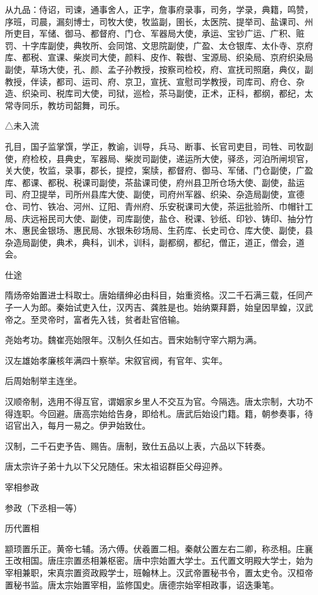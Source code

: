 \documentclass[a4paper,12pt,UTF8,twoside]{ctexbook}
\begin{document}
    从九品：侍诏，司谏，通事舍人，正字，詹事府录事，司务，学录，典籍，鸣赞，序班，司晨，漏刻博士，司牧大使，牧监副，圉长，太医院、提举司、盐课司、州所吏目，军储、御马、都督府、门仓、军器局大使，承运、宝钞广运、广积、赃罚、十字库副使，典牧所、会同馆、文思院副使，广盈、太仓银库、太仆寺、京府库、都税、宣课、柴炭司大使，颜料、皮作、鞍辔、宝源局、织染局、京府织染局副使，草场大使，孔、颜、孟子孙教授，按察司检校，府、宣抚司照磨，典仪，副教授，伴读，都司、运司、府、京卫，宣抚、宣慰司学教授，司库司、府仓、杂造、织染司、税库司大使，司狱，巡检，茶马副使，正术，正科，都纲，都纪，太常寺同乐，教坊司韶舞，司乐。
    
    △未入流
    
    孔目，国子监掌馔，学正，教谕，训导，兵马、断事、长官司吏目，司牲、司牧副使，府检校，县典史，军器局、柴炭司副使，递运所大使，驿丞，河泊所闸坝官，关大使，牧监，录事，郡长，提控，案牍，都督府、御马、军储、门仓副使，广盈库、都课、都税、税课司副使，茶盐课司使，府州县卫所仓场大使、副使，盐运司、府卫提举，司所州县库大使、副使，司府州军器、织染、杂造局副使，宣德仓、司竹、铁冶、河州、辽阳、青州府、乐安税课司大使，茶运批验所、巾帽针工局、庆远裕民司大使、副使，司库副使，盐仓、税课、钞纸、印钞、铸印、抽分竹木、惠民金银场、惠民局、水银朱砂场局、生药库、长史司仓、库大使、副使，县杂造局副使，典术，典科，训术，训科，副都纲，都纪，僧正，道正，僧会，道会。
    
    仕途
    
    隋炀帝始置进士科取士。唐始缙绅必由科目，始重资格。汉二千石满三载，任同产子一人为郎。秦始试吏入仕，汉丙吉、龚胜是也。始纳粟拜爵，始皇因旱蝗，汉武帝之。至灵帝时，富者先入钱，贫者赴官倍输。
    
    尧始考功。魏崔亮始限年。汉制久任如古。晋宋始制守宰六期为满。
    
    汉左雄始孝廉核年满四十察举。宋叙官阀，有官年、实年。
    
    后周始制举主连坐。
    
    汉顺帝制，选用不得互官，谓姻家乡里人不交互为官。今隔选。唐太宗制，大功不得连职。今回避。唐高宗始给告身，即给札。唐武后始设门籍。籍，朝参奏事，待诏官出入，每月一易之。伊尹始致仕。
    
    汉制，二千石吏予告、赐告。唐制，致仕五品以上表，六品以下转奏。
    
    唐太宗许子弟十九以下父兄随任。宋太祖诏群臣父母迎养。
    
    宰相参政
    
    参政（下丞相一等）
    
    历代置相
    
    颛顼置乐正。黄帝七辅。汤六傅。伏羲置二相。秦献公置左右二卿，称丞相。庄襄王改相国。唐庄宗置丞相兼枢密。唐中宗始置大学士。五代置文明殿大学士，始为宰相兼职，宋真宗置资政殿学士，班翰林上。汉武帝置秘书令，置太史令。汉桓帝置秘书监。唐太宗始置宰相，监修国史。唐德宗始宰相政事，诏迭秉笔。
    
\end{document}
